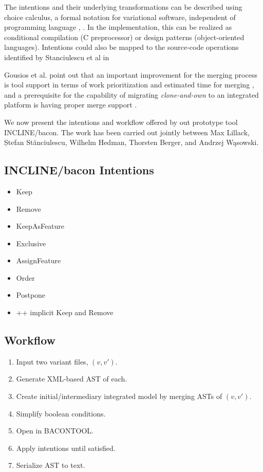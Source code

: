 The intentions and their underlying transformations can be described using choice calculus, a formal notation for variational software, independent of programming language \cite{erwig2011choice}, \cite{walkingshaw2012choice}. In the implementation, this can be realized as conditional compilation (C preprocessor) or design patterns (object-oriented languages). Intentions could also be mapped to the source-code operations identified by Stanciulescu et al in \cite{stanciulescu2016concepts}

Gousios et al. point out that an important improvement for the merging process is tool support in terms of work prioritization and estimated time for merging \cite{gousios2015}, and a prerequisite for the capability of migrating \textit{clone-and-own} to an integrated platform is having proper merge support \cite{antkiewicz2014flexible}.

We now present the intentions and workflow offered by out prototype tool INCLINE/bacon. The work has been carried out jointly between Max Lillack, Ștefan St\u{a}nciulescu, Wilhelm Hedman, Thorsten Berger, and Andrzej W\k{a}sowski.

\subsection{INCLINE/bacon Intentions}
\begin{itemize}
    \item{Keep}
    \item{Remove}
    \item{KeepAsFeature}
    \item{Exclusive}
    \item{AssignFeature}
    \item{Order}
    \item{Postpone}
    \item{++ implicit Keep and Remove}
\end{itemize}

\subsection{Workflow}
\begin{enumerate}
    \item Input two variant files, $(v, v')$. 
    \item Generate XML-based AST of each.
    \item Create initial/intermediary integrated model by merging ASTs of $(v, v')$.
    \item Simplify boolean conditions.
    \item Open in BACONTOOL.
    \item Apply intentions until satisfied.
    \item Serialize AST to text.
\end{enumerate}


